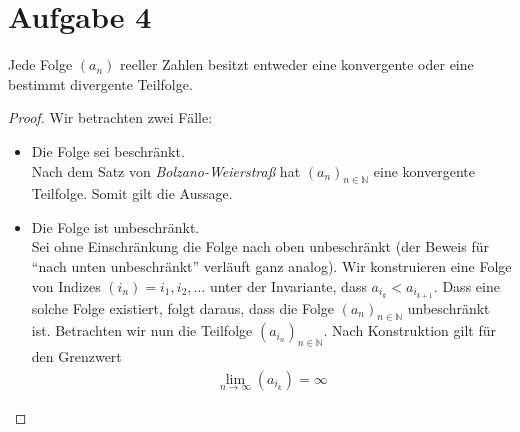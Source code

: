 \documentclass{scrreprt}
\newcommand{\NN}{\mathbb{N}}
\begin{document}
    \section*{Aufgabe 4}
    Jede Folge $(a_{n})$ reeller Zahlen besitzt entweder eine konvergente oder eine bestimmt divergente Teilfolge.
    \begin{proof}
    Wir betrachten zwei Fälle:
    \begin{itemize}
        \item
            Die Folge sei beschränkt.\\
            Nach dem Satz von \emph{Bolzano-Weierstraß} hat $(a_n)_{n \in \NN}$ eine konvergente Teilfolge. Somit gilt die Aussage.
        \item
            Die Folge ist unbeschränkt.\\
            Sei ohne Einschränkung die Folge nach oben unbeschränkt (der Beweis für "`nach unten unbeschränkt"' verläuft ganz analog). Wir konstruieren eine Folge von Indizes $(i_n) = i_1, i_2, \dots$ unter der Invariante, dass $a_{i_k} < a_{i_{k+1}}$. Dass eine solche Folge existiert, folgt daraus, dass die Folge $(a_n)_{n \in \NN}$ unbeschränkt ist. Betrachten wir nun die Teilfolge $(a_{i_n})_{n \in \NN}$. Nach Konstruktion gilt für den Grenzwert
            \begin{align*}
                \lim\limits_{n \to \infty} (a_{i_k}) = \infty
            \end{align*}
    \end{itemize}
    \end{proof}
\end{document}
